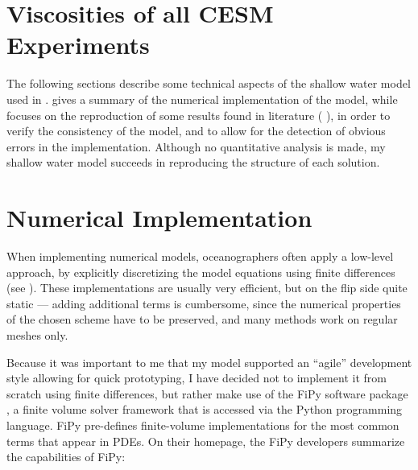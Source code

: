 \section{Viscosities of all CESM Experiments}
\label{sec:viscosity-all}
\vfill
\begin{whole}
	\centering{}
\end{whole}
\vfill
\clearpage
\null
\vfill
{
	\centering{}\par
}
\vfill

\label{appendix:shallow-water}
The following sections describe some technical aspects of the shallow water model used in .  gives a summary of the numerical implementation of the model, while  focuses on the reproduction of some results found in literature (\cite{killworth} \cite{greatbatch}), in order to verify the consistency of the model, and to allow for the detection of obvious errors in the implementation. Although no quantitative analysis is made, my shallow water model succeeds in reproducing the structure of each solution.

\section{Numerical Implementation}
\label{sec:appendix-sw-implementation}
When implementing numerical models, oceanographers often apply a low-level approach, by explicitly discretizing the model equations using finite differences (see \eg \cite{kaempf}). These implementations are usually very efficient, but on the flip side quite static --- adding additional terms is cumbersome, since the numerical properties of the chosen scheme have to be preserved, and many methods work on regular meshes only.

Because it was important to me that my model supported an \enquote{agile} development style allowing for quick prototyping, I have decided not to implement it from scratch using finite differences, but rather make use of the FiPy software package \citep{fipy}, a finite volume solver framework that is accessed via the Python programming language. FiPy pre-defines finite-volume implementations for the most common terms that appear in \acp{PDE}. On their homepage, the FiPy developers summarize the capabilities of FiPy:

